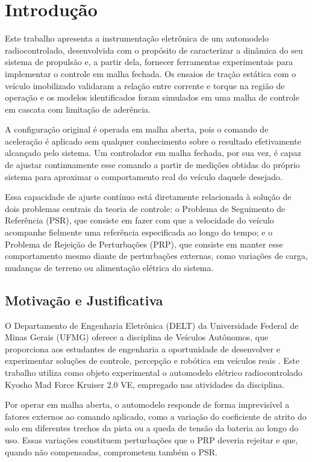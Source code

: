 \chapter{Introdução}
\label{chap:introducao}

Este trabalho apresenta a instrumentação eletrônica de um automodelo radiocontrolado,
desenvolvida com o propósito de caracterizar a dinâmica do seu sistema de propulsão e, a
partir dela, fornecer ferramentas experimentais para implementar o controle em malha fechada.
Os ensaios de tração estática com o veículo imobilizado validaram a relação entre corrente e
torque na região de operação e os modelos identificados foram simulados em uma malha de 
controle em cascata com limitação de aderência.

A configuração original é operada em malha aberta, pois o comando de
aceleração é aplicado sem qualquer conhecimento sobre o resultado efetivamente alcançado pelo
sistema. Um controlador em malha fechada, por sua vez, é capaz de ajustar continuamente esse
comando a partir de medições obtidas do próprio sistema para aproximar o comportamento
real do veículo daquele desejado.

Essa capacidade de ajuste contínuo está diretamente relacionada à solução de dois problemas
centrais da teoria de controle: o Problema de Seguimento de Referência (PSR), que consiste em
fazer com que a velocidade do veículo acompanhe fielmente uma referência especificada ao
longo do tempo; e o Problema de Rejeição de Perturbações (PRP), que consiste em manter esse
comportamento mesmo diante de perturbações externas, como variações de carga, mudanças de terreno ou
alimentação elétrica do sistema.

\section{Motivação e Justificativa}
\label{sec:motivacao}

O Departamento de Engenharia Eletrônica (DELT) da Universidade Federal de Minas Gerais
(UFMG) oferece a disciplina de Veículos Autônomos, que proporciona aos estudantes
de engenharia a oportunidade de desenvolver e experimentar soluções de controle, percepção e
robótica em veículos reais \cite{delt_site}. Este trabalho utiliza como objeto experimental o
automodelo elétrico radiocontrolado Kyosho Mad Force Kruiser 2.0 VE, empregado nas atividades da disciplina.

Por operar em malha aberta, o automodelo responde de forma imprevisível a fatores externos ao
comando aplicado, como a variação do coeficiente de atrito do solo em diferentes trechos da
pista ou a queda de tensão da bateria ao longo do uso. Essas variações constituem
perturbações que o PRP deveria rejeitar e que, quando não compensadas, comprometem também o
PSR.

